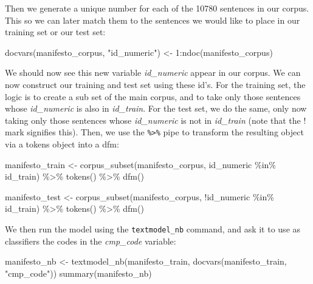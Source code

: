 \documentclass[
]{book}
\newenvironment{Shaded}{\begin{snugshade}}{\end{snugshade}}
\newcommand{\DecValTok}[1]{\textcolor[rgb]{0.00,0.00,0.81}{#1}}
\newcommand{\FunctionTok}[1]{\textcolor[rgb]{0.00,0.00,0.00}{#1}}
\newcommand{\NormalTok}[1]{#1}
\newcommand{\OtherTok}[1]{\textcolor[rgb]{0.56,0.35,0.01}{#1}}
\newcommand{\SpecialCharTok}[1]{\textcolor[rgb]{0.00,0.00,0.00}{#1}}
\newcommand{\StringTok}[1]{\textcolor[rgb]{0.31,0.60,0.02}{#1}}
\begin{document}
Then we generate a unique number for each of the 10780 sentences in our corpus. This so we can later match them to the sentences we would like to place in our training set or our test set:

\begin{Shaded}
\begin{Highlighting}[]
\FunctionTok{docvars}\NormalTok{(manifesto\_corpus, }\StringTok{"id\_numeric"}\NormalTok{) }\OtherTok{\textless{}{-}} \DecValTok{1}\SpecialCharTok{:}\FunctionTok{ndoc}\NormalTok{(manifesto\_corpus)}
\end{Highlighting}
\end{Shaded}

We should now see this new variable \emph{id\_numeric} appear in our corpus. We can now construct our training and test set using these id's. For the training set, the logic is to create a sub set of the main corpus, and to take only those sentences whose \emph{id\_numeric} is also in \emph{id\_train}. For the test set, we do the same, only now taking only those sentences whose \emph{id\_numeric} is not in \emph{id\_train} (note that the ! mark signifies this). Then, we use the \texttt{\%\textgreater{}\%} pipe to transform the resulting object via a tokens object into a dfm:

\begin{Shaded}
\begin{Highlighting}[]
\NormalTok{manifesto\_train }\OtherTok{\textless{}{-}} \FunctionTok{corpus\_subset}\NormalTok{(manifesto\_corpus, id\_numeric }\SpecialCharTok{\%in\%}\NormalTok{ id\_train) }\SpecialCharTok{\%\textgreater{}\%}
  \FunctionTok{tokens}\NormalTok{() }\SpecialCharTok{\%\textgreater{}\%}
    \FunctionTok{dfm}\NormalTok{()}

\NormalTok{manifesto\_test }\OtherTok{\textless{}{-}} \FunctionTok{corpus\_subset}\NormalTok{(manifesto\_corpus, }\SpecialCharTok{!}\NormalTok{id\_numeric }\SpecialCharTok{\%in\%}\NormalTok{ id\_train) }\SpecialCharTok{\%\textgreater{}\%}
    \FunctionTok{tokens}\NormalTok{() }\SpecialCharTok{\%\textgreater{}\%}
    \FunctionTok{dfm}\NormalTok{()}
\end{Highlighting}
\end{Shaded}

We then run the model using the \texttt{textmodel\_nb} command, and ask it to use as classifiers the codes in the \emph{cmp\_code} variable:

\begin{Shaded}
\begin{Highlighting}[]
\NormalTok{manifesto\_nb }\OtherTok{\textless{}{-}} \FunctionTok{textmodel\_nb}\NormalTok{(manifesto\_train, }\FunctionTok{docvars}\NormalTok{(manifesto\_train, }\StringTok{"cmp\_code"}\NormalTok{))}
\FunctionTok{summary}\NormalTok{(manifesto\_nb)}
\end{Highlighting}
\end{Shaded}
\end{document}
